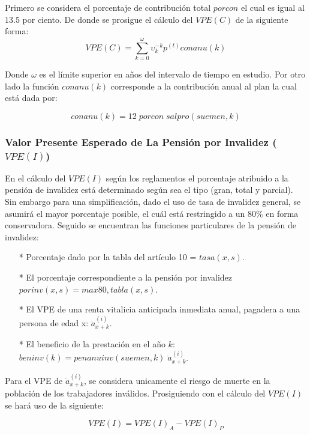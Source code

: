 \documentclass[12pt,letterpaper,titlepage]{article}
\begin{document}
Primero se considera el porcentaje de contribución total $porcon$ el cual es igual al $13.5$ por ciento. De donde se prosigue el cálculo del $V\!PE(C)$ de la siguiente forma:
\begin{equation*}
V\!PE(C)=\sum \limits_{k=0}^\omega \upsilon^{-k}_{k}p^{(t)} conanu(k)
\end{equation*}

Donde $\omega$ es el límite superior en años del intervalo de tiempo en estudio. Por otro lado la función $conanu(k)$ corresponde a la contribución anual al plan la cual está dada por:

\begin{equation*}
conanu(k)=12\;porcon\;sal\!pro(suemen,k)
\end{equation*}

\subsubsection{Valor Presente Esperado de La Pensión por Invalidez ($V\!PE(I)$)}

En el cálculo del $V\!PE(I)$ según los reglamentos el porcentaje atribuido a la pensión de invalidez está determinado según sea el tipo (gran, total y parcial). Sin embargo para una simplificación, dado el uso de tasa de invalidez general, se asumirá el mayor porcentaje posible, el cuál está restringido a un 80\% en forma conservadora. Seguido se encuentran las funciones particulares de la pensión de invalidez:

\begin{itemize}
	\item [*] Porcentaje dado por la tabla del artículo 10 = $tasa(x,s)$.
	\item [*] El porcentaje correspondiente a la pensión por invalidez $porinv(x,s)=max{80, tabla(x,s)}$.
	\item [*] El VPE de una renta vitalicia anticipada inmediata anual, pagadera a una persona de edad x: $\ddot{a}^{(i)}_{x+k}$.  
	\item [*] El beneficio de la  prestación en el año $k$: $beninv(k)=penanuinv(suemen,k)\;\ddot{a}^{(i)}_{x+k}$.
\end{itemize}

Para el VPE de $\ddot{a}^{(i)}_{x+k}$, se considera unicamente el riesgo de muerte en la población de los trabajadores inválidos. Prosiguiendo con el cálculo del $V\!PE(I)$ se hará uso de la siguiente:

\begin{equation*}
V\!PE(I)=V\!PE(I)_{A}-V\!PE(I)_{P}
\end{equation*}
\end{document}
